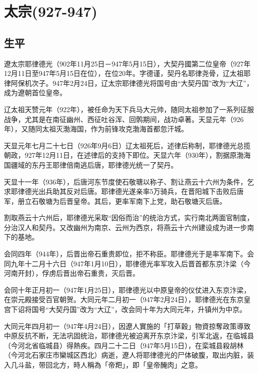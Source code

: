 
\section{太宗\tiny(927-947)}


\subsection{生平}

遼太宗耶律德光（902年11月25日－947年5月15日），大契丹國第二位皇帝（927年12月11日至947年5月15日在位），在位20年。字德谨，契丹名耶律尧骨，辽太祖耶律阿保机次子。947年2月24日，辽太宗耶律德光将国号由“大契丹国”改为“大辽”，成为遼朝首位皇帝。

辽太祖天赞元年（922年），被任命为天下兵马大元帅，随同太祖参加了一系列征服战争，尤其是在南征幽州、西征吐谷浑、回鹘期间，战功卓著。天显元年（926年），又随同太祖灭渤海国，作为前锋攻克渤海首都忽汗城。

天显元年七月二十七日（926年9月6日）辽太祖死后，述律后称制，耶律德光总揽朝政，927年12月11日，在述律后的支持下即位。天显六年（930年），割据原渤海国疆域的东丹王耶律倍南逃后唐，耶律德光统一了契丹。

天显十一年（936年），后唐河东节度使石敬瑭以称子、割让燕云十六州为条件，乞求耶律德光出兵助其反对后唐。耶律德光遂亲率5万骑兵，在晋阳城下击败后唐军，册立石敬塘为后晋皇帝。其后，更率军南下上党，助石敬塘灭后唐。

割取燕云十六州后，耶律德光采取“因俗而治”的统治方式，实行南北两面官制度，分治汉人和契丹。又改幽州为南京、云州为西京，将燕云十六州建设成为进一步南下的基地。

会同四年（944年），后晋出帝石重贵即位，拒不称臣。耶律德光于是率军南下。会同九年十二月十六日（947年1月10日），耶律德光率军攻入后晋首都东京汴梁（今河南开封），俘虏后晋出帝石重贵，灭后晋。

会同十年正月初一（947年1月25日），耶律德光以中原皇帝的仪仗进入东京汴梁，在崇元殿接受百官朝贺。大同元年二月初一（947年2月24日），耶律德光在东京皇宫下诏将国号“大契丹国”改为“大辽”，改会同十年为大同元年，升镇州为中京。

大同元年四月初一（947年4月24日），因遼人實施的「打草穀」物資掠奪政策導致中原反抗不断，无法巩固统治，耶律德光被迫离开东京汴梁，引军北返，在临城县（今河北省临城县）得熱疾。四月二十二日（947年5月15日），在栾城县殺胡林（今河北石家庄市欒城区西北）病逝，遼人将耶律德光的尸体破腹，取出内脏，装入几斗盐，带回北方，時人稱為「帝羓」，即「皇帝醃肉」之意。

